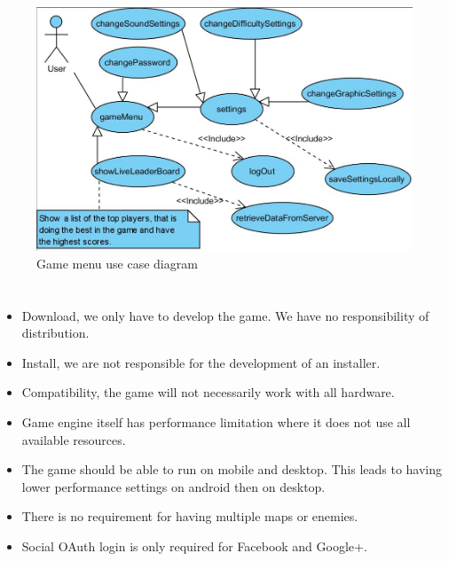 \documentclass[letterpaper]{article}
\begin{document}
		\begin{figure}[H]
		\centering
		\includegraphics[width=180mm]{UML_Diagram/Use_Case/game_menu}
		\caption{Game menu use case diagram}
		\label{overflow}
		\end{figure}
		
		\section*{\colorbox{black}{}} 
		\vspace{0.2in}
		
		\begin{itemize}
  		\item Download, we only have to develop the game. We have no responsibility of distribution.
  		\item Install, we are not responsible for the development of an installer.
  		\item Compatibility, the game will not necessarily work with all hardware.
  		\item Game engine itself has performance limitation where it does not use all available resources.
  		\item The game should be able to run on mobile and desktop. This leads to having lower performance settings on android then on desktop.
  		\item There is no requirement for having multiple maps or enemies.
  		\item Social OAuth login is only required for Facebook and Google+.
		\end{itemize}
		
\end{document}
